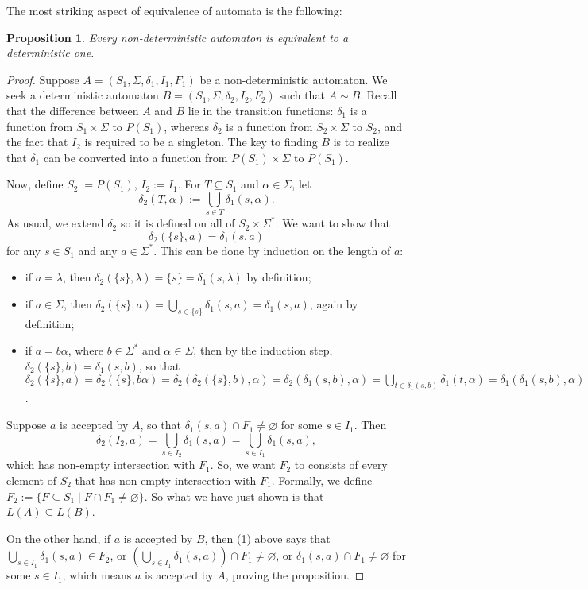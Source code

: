 \documentclass[12pt]{article}
\newtheorem{prop}{Proposition}
\begin{document}
The most striking aspect of equivalence of automata is the following: 
\begin{prop} Every non-deterministic automaton is equivalent to a deterministic one. \end{prop}
\begin{proof}  Suppose $A=(S_1,\Sigma,\delta_1,I_1,F_1)$ be a non-deterministic automaton.  We seek a deterministic automaton $B=(S_1,\Sigma, \delta_2,I_2,F_2)$ such that $A\sim B$.  Recall that the difference between $A$ and $B$ lie in the transition functions: $\delta_1$ is a function from $S_1\times \Sigma$ to $P(S_1)$, whereas $\delta_2$ is a function from $S_2\times \Sigma$ to $S_2$, and the fact that $I_2$ is required to be a singleton.  The key to finding $B$ is to realize that $\delta_1$ can be converted into a function from $P(S_1)\times \Sigma$ to $P(S_1)$.

Now, define $S_2:=P(S_1)$, $I_2:=I_1$.  For $T\subseteq S_1$ and $\alpha\in \Sigma$, let $$\delta_2(T,\alpha):=\bigcup_{s\in T} \delta_1(s,\alpha).$$
As usual, we extend $\delta_2$ so it is defined on all of $S_2\times \Sigma^*$.  We want to show that $$\delta_2(\lbrace s\rbrace, a)=\delta_1(s,a)$$ for any $s\in S_1$ and any $a\in \Sigma^*$.  This can be done by induction on the length of $a$:
\begin{itemize}
\item if $a=\lambda$, then $\delta_2(\lbrace s\rbrace,\lambda)=\lbrace s\rbrace = \delta_1(s,\lambda)$ by definition;
\item if $a\in \Sigma$, then $\delta_2(\lbrace s\rbrace, a)=\bigcup_{s\in\lbrace s\rbrace}\delta_1(s,a)=\delta_1(s,a)$, again by definition;
\item if $a=b\alpha$, where $b\in \Sigma^*$ and $\alpha\in \Sigma$, then by the induction step, $\delta_2(\lbrace s\rbrace,b)=\delta_1(s,b)$, so that $\delta_2(\lbrace s\rbrace,a)= \delta_2(\lbrace s\rbrace,b\alpha)=\delta_2(\delta_2(\lbrace s\rbrace,b),\alpha) = \delta_2(\delta_1(s,b),\alpha)=\bigcup_{t\in \delta_1(s,b)} \delta_1(t,\alpha)=\delta_1(\delta_1(s,b),\alpha)=\delta_1(s,b\alpha)=\delta_1(s,a)$.
\end{itemize}
Suppose $a$ is accepted by $A$, so that $\delta_1(s,a)\cap F_1\ne \varnothing$ for some $s\in I_1$.  Then 
\begin{equation}
\delta_2(I_2, a)=\bigcup_{s\in I_2} \delta_1(s,a)=\bigcup_{s\in I_1} \delta_1(s,a),
\end{equation}
which has non-empty intersection with $F_1$.  So, we want $F_2$ to consists of every element of $S_2$ that has non-empty intersection with $F_1$.  Formally, we define $F_2:=\lbrace F\subseteq S_1\mid F\cap F_1\ne \varnothing\rbrace$.  So what we have just shown is that $L(A)\subseteq L(B)$.  

On the other hand, if $a$ is accepted by $B$, then (1) above says that $\bigcup_{s\in I_1} \delta_1(s,a) \in F_2$, or $(\bigcup_{s\in I_1} \delta_1(s,a))\cap F_1\ne \varnothing$, or $\delta_1(s,a)\cap F_1\ne \varnothing$ for some $s\in I_1$, which means $a$ is accepted by $A$, proving the proposition.
\end{proof}
\end{document}
